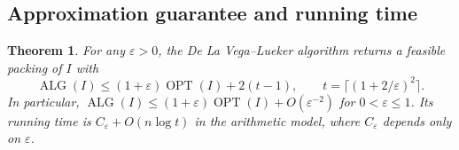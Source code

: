 \documentclass[11pt,a4paper,onecolumn]{article}
\theoremstyle{plain}
\newtheorem{theorem}{Theorem}[section]
\theoremstyle{definition}
\theoremstyle{remark}
\DeclareMathOperator{\OPT}{OPT}
\DeclareMathOperator{\ALG}{ALG}
\begin{document}
\subsection{Approximation guarantee and running time}
\label{subsec:dlvl-guarantee}

\begin{theorem}\label{thm:dlvl-guarantee}
For any $\varepsilon>0$, the De La Vega--Lueker algorithm returns a
feasible packing of $I$ with
\[
  \ALG(I)\le(1+\varepsilon)\OPT(I)+2(t-1),\qquad
  t=\bigl\lceil(1+2/\varepsilon)^2\bigr\rceil .
\]
In particular,
$\ALG(I)\le(1+\varepsilon)\OPT(I)+O(\varepsilon^{-2})$ for
$0<\varepsilon\le1$. Its running time is $C_\varepsilon+O(n\log t)$ in
the arithmetic model, where $C_\varepsilon$ depends only on
$\varepsilon$.
\end{theorem}
\end{document}
